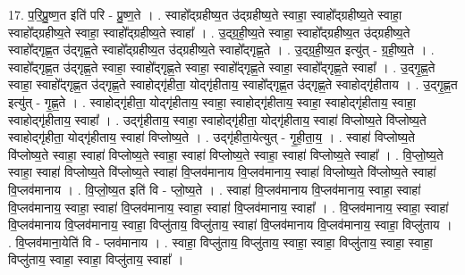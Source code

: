 \documentclass[17pt]{extarticle}
\begin{document}
17. प॒रि॒प्रु॒ष्ण॒त इति॑ परि - प्रु॒ष्ण॒ते । . स्वाहो᳚द्ग्रहीष्य॒त उ॑द्ग्रहीष्य॒ते स्वाहा॒ स्वाहो᳚द्ग्रहीष्य॒ते स्वाहा॒ स्वाहो᳚द्ग्रहीष्य॒ते स्वाहा॒ 
स्वाहो᳚द्ग्रहीष्य॒ते स्वाहा᳚ । . उ॒द्ग्र॒ही॒ष्य॒ते स्वाहा॒ स्वाहो᳚द्ग्रहीष्य॒त उ॑द्ग्रहीष्य॒ते स्वाहो᳚द्‌गृह्ण॒त उ॑द्‌गृह्ण॒ते 
स्वाहो᳚द्‌ग्रहीष्य॒त उ॑द्ग्रहीष्य॒ते स्वाहो᳚द्‌गृह्ण॒ते । . उ॒द्ग्र॒ही॒ष्य॒त इत्यु॑त् - ग्र॒ही॒ष्य॒ते । . स्वाहो᳚द्‌गृह्ण॒त उ॑द्‌गृह्ण॒ते स्वाहा॒ स्वाहो᳚द्‌गृह्ण॒ते स्वाहा॒ स्वाहो᳚द्‌गृह्ण॒ते स्वाहा॒ 
स्वाहो᳚द्‌गृह्ण॒ते स्वाहा᳚ । . उ॒द्‍गृ॒ह्ण॒ते स्वाहा॒ स्वाहो᳚द्‍गृह्ण॒त उ॑द्‍गृह्ण॒ते स्वाहोद्‍गृ॑हीता॒ योद्‍गृ॑हीताय॒ स्वाहो᳚द्‍गृह्ण॒त उ॑द्‍गृह्ण॒ते स्वाहोद्‍गृ॑हीताय । . उ॒द्‍गृ॒ह्ण॒त इत्यु॑त् - गृ॒ह्ण॒ते । . स्वाहोद्‍गृ॑हीता॒ योद्‍गृ॑हीताय॒ स्वाहा॒ स्वाहोद्‍गृ॑हीताय॒ स्वाहा॒ स्वाहोद्‍गृ॑हीताय॒ स्वाहा॒ स्वाहोद्‍गृ॑हीताय॒ स्वाहा᳚ । . उद्‍गृ॑हीताय॒ स्वाहा॒ स्वाहोद्‍गृ॑हीता॒ योद्‍गृ॑हीताय॒ स्वाहा॑ विप्लोष्य॒ते वि॑प्लोष्य॒ते स्वाहोद्‍गृ॑हीता॒
योद्‍गृ॑हीताय॒ स्वाहा॑ विप्लोष्य॒ते । . उद्‍गृ॑हीता॒येत्युत् - गृ॒ही॒ता॒य॒ । . स्वाहा॑ विप्लोष्य॒ते वि॑प्लोष्य॒ते स्वाहा॒ स्वाहा॑ विप्लोष्य॒ते स्वाहा॒ स्वाहा॑ विप्लोष्य॒ते स्वाहा॒ स्वाहा॑ विप्लोष्य॒ते स्वाहा᳚ । . वि॒प्लो॒ष्य॒ते स्वाहा॒ स्वाहा॑ विप्लोष्य॒ते वि॑प्लोष्य॒ते स्वाहा॑ वि॒प्लव॑मानाय वि॒प्लव॑मानाय॒ स्वाहा॑ विप्लोष्य॒ते वि॑प्लोष्य॒ते स्वाहा॑ वि॒प्लव॑मानाय । . वि॒प्लो॒ष्य॒त इति॑ वि - प्लो॒ष्य॒ते । . स्वाहा॑ वि॒प्लव॑मानाय वि॒प्लव॑मानाय॒ स्वाहा॒ स्वाहा॑ वि॒प्लव॑मानाय॒ स्वाहा॒ स्वाहा॑ वि॒प्लव॑मानाय॒ स्वाहा॒ स्वाहा॑ वि॒प्लव॑मानाय॒ स्वाहा᳚ । . वि॒प्लव॑मानाय॒ स्वाहा॒ स्वाहा॑ वि॒प्लव॑मानाय वि॒प्लव॑मानाय॒ स्वाहा॒ विप्लु॑ताय॒ विप्लु॑ताय॒ स्वाहा॑ वि॒प्लव॑मानाय वि॒प्लव॑मानाय॒ स्वाहा॒ विप्लु॑ताय । . वि॒प्लव॑माना॒येति॑ वि - प्लव॑मानाय । . स्वाहा॒ विप्लु॑ताय॒ विप्लु॑ताय॒ स्वाहा॒ स्वाहा॒ विप्लु॑ताय॒ स्वाहा॒ स्वाहा॒ विप्लु॑ताय॒ स्वाहा॒ स्वाहा॒ विप्लु॑ताय॒ स्वाहा᳚ । \newline
\end{document}
